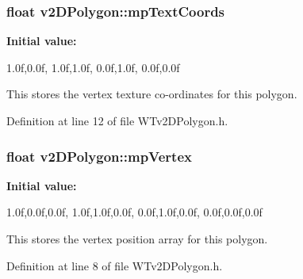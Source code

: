 \hypertarget{classv2_d_polygon_a80704feccc5934a85bcf5837142c865c}{
\subsubsection[{mpTextCoords}]{\setlength{\rightskip}{0pt plus 5cm}float {\bf v2DPolygon::mpTextCoords}}}
\label{classv2_d_polygon_a80704feccc5934a85bcf5837142c865c}
{\bfseries Initial value:}
\begin{DoxyCode}

{
 1.0f,0.0f,
 1.0f,1.0f,
 0.0f,1.0f,
 0.0f,0.0f
}
\end{DoxyCode}


This stores the vertex texture co-\/ordinates for this polygon. 



Definition at line 12 of file WTv2DPolygon.h.

\hypertarget{classv2_d_polygon_a8862118bbcb236dd1188f4dda9533152}{
\subsubsection[{mpVertex}]{\setlength{\rightskip}{0pt plus 5cm}float {\bf v2DPolygon::mpVertex}}}
\label{classv2_d_polygon_a8862118bbcb236dd1188f4dda9533152}
{\bfseries Initial value:}
\begin{DoxyCode}

{
 1.0f,0.0f,0.0f,
 1.0f,1.0f,0.0f,
 0.0f,1.0f,0.0f,
 0.0f,0.0f,0.0f}
\end{DoxyCode}


This stores the vertex position array for this polygon. 



Definition at line 8 of file WTv2DPolygon.h.

